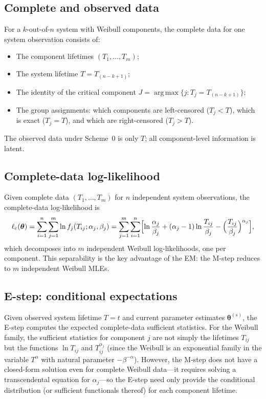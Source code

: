 \documentclass[12pt]{article}
\theoremstyle{definition}
\theoremstyle{remark}
\newcommand{\btheta}{\bm{\theta}}
\DeclareMathOperator*{\argmax}{arg\,max}
\begin{document}
\subsection{Complete and observed data}

For a $k$-out-of-$n$ system with Weibull components, the complete
data for one system observation consists of:
\begin{itemize}
\item The component lifetimes $(T_1, \ldots, T_m)$;
\item The system lifetime $T = T_{(n-k+1)}$;
\item The identity of the critical component
  $J = \argmax\{j : T_j = T_{(n-k+1)}\}$;
\item The group assignments: which components are left-censored
  ($T_j < T$), which is exact ($T_j = T$), and which are
  right-censored ($T_j > T$).
\end{itemize}
The observed data under Scheme~0 is only $T$; all component-level
information is latent.

\subsection{Complete-data log-likelihood}

Given complete data $(T_1, \ldots, T_m)$ for $n$ independent
system observations, the complete-data log-likelihood is
\begin{equation}\label{eq:complete-loglik}
  \ell_c(\btheta) = \sum_{i=1}^n \sum_{j=1}^m
    \ln f_j(T_{ij}; \alpha_j, \beta_j)
  = \sum_{j=1}^m \sum_{i=1}^n \Bigl[
    \ln \frac{\alpha_j}{\beta_j}
    + (\alpha_j - 1) \ln \frac{T_{ij}}{\beta_j}
    - \Bigl(\frac{T_{ij}}{\beta_j}\Bigr)^{\alpha_j}
  \Bigr],
\end{equation}
which decomposes into $m$ independent Weibull log-likelihoods, one
per component.  This separability is the key advantage of the EM:
the M-step reduces to $m$ independent Weibull MLEs.

\subsection{E-step: conditional expectations}

Given observed system lifetime $T = t$ and current parameter
estimates $\btheta^{(s)}$, the E-step computes the expected
complete-data sufficient statistics.  For the Weibull family, the
sufficient statistics for component $j$ are not simply the
lifetimes $T_{ij}$ but the functions $\ln T_{ij}$ and
$T_{ij}^{\alpha_j}$ (since the Weibull is an exponential family
in the variable $T^{\alpha}$ with natural parameter
$-\beta^{-\alpha}$).  However, the M-step does not have a
closed-form solution even for complete Weibull data---it requires
solving a transcendental equation for $\alpha_j$---so the E-step
need only provide the conditional distribution (or sufficient
functionals thereof) for each component lifetime.
\end{document}
